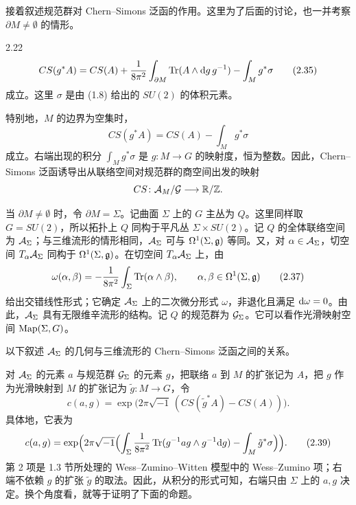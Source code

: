 接着叙述规范群对 Chern--Simons 泛函的作用。这里为了后面的讨论，也一并考察 $\partial M\neq\emptyset$ 的情形。

\begin{proposition}{2.22}
  \begin{equation}
    CS(g^{*}A)=CS(A)+\frac{1}{8\pi^{2}}\int_{\partial M}\operatorname{Tr}(A\wedge \mathrm{d} g\,g^{-1})-\int_{M}g^{*}\sigma \tag{2.35}
  \end{equation}
  成立。这里 $\sigma$ 是由 (1.8) 给出的 $SU(2)$ 的体积元素。
\end{proposition}

特别地，$M$ 的边界为空集时，
\begin{equation}
  CS(g^{*}A)=CS(A)-\int_{M}g^{*}\sigma \tag{2.36}
\end{equation}
成立。右端出现的积分 $\int_{M}g^{*}\sigma$ 是 $g\colon M\to G$ 的映射度，恒为整数。因此，Chern--Simons 泛函诱导出从联络空间对规范群的商空间出发的映射
\begin{equation*}
  CS\colon\mathcal{A}_M/\mathcal{G}\longrightarrow\mathbb{R}/\mathbb{Z}.
\end{equation*}


当 $\partial M\neq\emptyset$ 时，令 $\partial M=\Sigma$。记曲面 $\Sigma$ 上的 $G$ 主丛为 $Q$。这里同样取 $G=SU(2)$，所以拓扑上 $Q$ 同构于平凡丛 $\Sigma\times SU(2)$。记 $Q$ 的全体联络空间为 $\mathcal{A}_\Sigma$；与三维流形的情形相同，$\mathcal{A}_\Sigma$ 可与 $\Omega^{1}(\Sigma,\mathfrak{g})$ 等同。又，对 $\alpha\in\mathcal{A}_\Sigma$，切空间 $T_{\alpha}\mathcal{A}_\Sigma$ 同构于 $\Omega^{1}(\Sigma,\mathfrak{g})$。在切空间 $T_{\alpha}\mathcal{A}_\Sigma$ 上，由
\begin{equation}
  \omega(\alpha,\beta)=-\frac{1}{8\pi^{2}}\int_{\Sigma}\operatorname{Tr}(\alpha\wedge\beta),\qquad \alpha,\beta\in\Omega^{1}(\Sigma,\mathfrak{g}) \tag{2.37}
\end{equation}
给出交错线性形式；它确定 $\mathcal{A}_\Sigma$ 上的二次微分形式 $\omega$，非退化且满足 $\mathrm{d}\omega=0$。由此，$\mathcal{A}_\Sigma$ 具有无限维辛流形的结构。记 $Q$ 的规范群为 $\mathcal{G}_\Sigma$。它可以看作光滑映射空间 $\operatorname{Map}(\Sigma,G)$。


以下叙述 $\mathcal{A}_\Sigma$ 的几何与三维流形的 Chern--Simons 泛函之间的关系。

对 $\mathcal{A}_\Sigma$ 的元素 $a$ 与规范群 $\mathcal{G}_\Sigma$ 的元素 $g$，把联络 $a$ 到 $M$ 的扩张记为 $A$，把 $g$ 作为光滑映射到 $M$ 的扩张记为 $\tilde{g}\colon M\to G$，令
\begin{equation}
  c(a,g)=\exp\bigl(2\pi\sqrt{-1}\,(CS(\tilde{g}^{*}A)-CS(A))\bigr). \tag{2.38}
\end{equation}
具体地，它表为
\begin{equation}
  c(a,g)=\exp\Bigl(2\pi\sqrt{-1}\Bigl(\int_{\Sigma}\frac{1}{8\pi^{2}}\operatorname{Tr}(g^{-1}ag\wedge g^{-1}\mathrm{d} g)-\int_{M}\tilde{g}^{*}\sigma\Bigr)\Bigr). \tag{2.39}
\end{equation}
第 2 项是 1.3 节所处理的 Wess--Zumino--Witten 模型中的 Wess--Zumino 项；右端不依赖 $g$ 的扩张 $\tilde{g}$ 的取法。因此，从积分的形式可知，右端只由 $\Sigma$ 上的 $a,g$ 决定。换个角度看，就等于证明了下面的命题。

